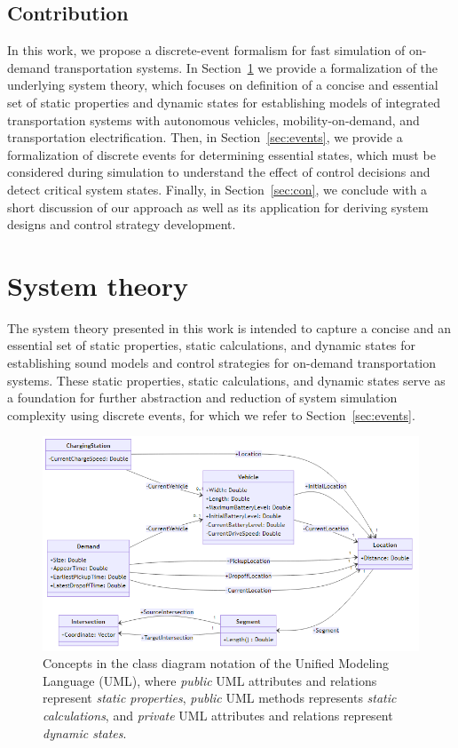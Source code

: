 \documentclass[graybox]{svmult}
\begin{document}
\subsection{Contribution}

In this work, we propose a discrete-event formalism for fast simulation of on-demand transportation systems.
In Section~\ref{sec:theory} we provide a formalization of the underlying system theory, which focuses on definition of a concise and essential set of static properties and dynamic states for establishing models of integrated transportation systems with autonomous vehicles, mobility-on-demand, and transportation electrification.
Then, in Section~\ref{sec:events}, we provide a formalization of discrete events for determining essential states, which must be considered during simulation to understand the effect of control decisions and detect critical system states.
Finally, in Section~\ref{sec:con}, we conclude with a short discussion of our approach as well as its application for deriving system designs and control strategy development.

\section{System theory}
\label{sec:theory}

The system theory presented in this work is intended to capture a concise and an essential set of static properties, static calculations, and dynamic states for establishing sound models and control strategies for on-demand transportation systems.
These static properties, static calculations, and dynamic states serve as a foundation for further abstraction and reduction of system simulation complexity using discrete events, for which we refer to Section~\ref{sec:events}.

\begin{figure}[htbp]
	\centering
	\includegraphics[width=\textwidth]{../../diagrams/model/classes-v0.1.png}
	\caption{Concepts in the class diagram notation of the Unified Modeling Language (UML), where \textit{public} UML attributes and relations represent \textit{static properties}, \textit{public} UML methods represents \textit{static calculations}, and \textit{private} UML attributes and relations represent \textit{dynamic states}.}
	\label{fig:concepts}
\end{figure}
\end{document}
